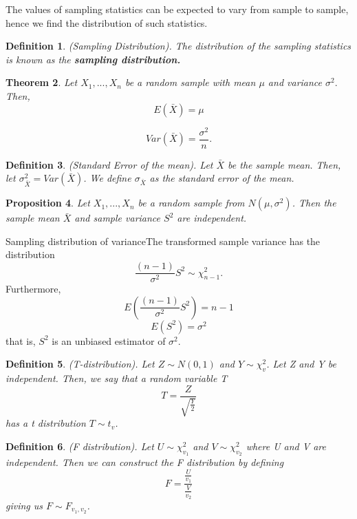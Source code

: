 \documentclass[twoside]{article}
\newcounter{lecnum}
\newtheorem{theorem}{Theorem}[lecnum]
\newtheorem{proposition}[theorem]{Proposition}
\newtheorem{definition}[theorem]{Definition}
\begin{document}
The values of sampling statistics can be expected to vary from sample to sample, hence we find the distribution of such statistics.

\begin{definition}(Sampling Distribution). The distribution of the sampling statistics is known as the \textbf{sampling distribution.}
\end{definition}


\begin{theorem}Let $X_1,...,X_n$ be a random sample with mean $\mu$ and variance $\sigma^2.$ Then,
$$
E(\bar{X}) = \mu
$$
 
$$
Var(\bar{X}) = \frac{\sigma^2}{n}.
$$
\end{theorem}

\begin{definition}(Standard Error of the mean). Let $\bar{X}$ be the sample mean. Then, let $\sigma_{\bar{X}}^{2} = Var(\bar{X})$. We define $\sigma_{\bar{X}}$ as the standard error of the mean.
\end{definition}


\begin{proposition}Let $X_1,...,X_n$ be a random sample from $N(\mu, \sigma^2)$. Then the sample mean $\bar{X}$ and sample variance $S^2$ are independent.
\end{proposition}

\begin{proposition_exam}{Sampling distribution of variance}{}The transformed sample variance has the distribution
$$
\frac{(n-1)}{\sigma^2}S^2 \sim \chi_{n-1}^2.
$$
Furthermore, 
$$
E(\frac{(n-1)}{\sigma^2}S^2) = n - 1
$$
$$
E(S^2) = \sigma^2
$$
that is, $S^2$ is an unbiased estimator of $\sigma^2.$
\end{proposition_exam}

\begin{definition}(T-distribution). Let $Z \sim N(0,1)$ and $Y \sim \chi_{v}^{2}$. Let Z and Y be independent. Then, we say that a random variable T
$$
T = \frac{Z}{\sqrt{\frac{Y}{2}}}
$$
has a t distribution $T \sim t_v$.
\end{definition}

\begin{definition}(F distribution). Let $U \sim \chi_{v_{1}}^2$ and $V \sim \chi_{v_{2}}^2$ where U and V are independent. Then we can construct the F distribution by defining
$$
F = \frac{\frac{U}{v_1}}{\frac{V}{v_2}}
$$
giving us $F \sim F_{v_{1}, v_{2}}$.
\end{definition}
\end{document}
